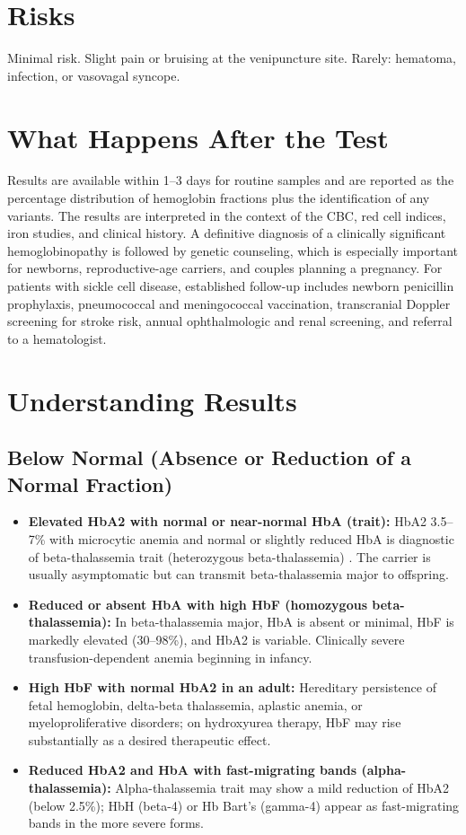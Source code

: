 \section*{Risks}
Minimal risk. Slight pain or bruising at the venipuncture site. Rarely: hematoma, infection, or vasovagal syncope.

\section*{What Happens After the Test}
Results are available within 1--3 days for routine samples and are reported as the percentage distribution of hemoglobin fractions plus the identification of any variants. The results are interpreted in the context of the CBC, red cell indices, iron studies, and clinical history. A definitive diagnosis of a clinically significant hemoglobinopathy is followed by genetic counseling, which is especially important for newborns, reproductive-age carriers, and couples planning a pregnancy. For patients with sickle cell disease, established follow-up includes newborn penicillin prophylaxis, pneumococcal and meningococcal vaccination, transcranial Doppler screening for stroke risk, annual ophthalmologic and renal screening, and referral to a hematologist.

\section*{Understanding Results}

\subsection*{Below Normal (Absence or Reduction of a Normal Fraction)}
\begin{itemize}
  \item \textbf{Elevated HbA2 with normal or near-normal HbA (trait):} HbA2 3.5--7\% with microcytic anemia and normal or slightly reduced HbA is diagnostic of beta-thalassemia trait (heterozygous beta-thalassemia) \cite{thein2013molecular}. The carrier is usually asymptomatic but can transmit beta-thalassemia major to offspring.
  \item \textbf{Reduced or absent HbA with high HbF (homozygous beta-thalassemia):} In beta-thalassemia major, HbA is absent or minimal, HbF is markedly elevated (30--98\%), and HbA2 is variable. Clinically severe transfusion-dependent anemia beginning in infancy.
  \item \textbf{High HbF with normal HbA2 in an adult:} Hereditary persistence of fetal hemoglobin, delta-beta thalassemia, aplastic anemia, or myeloproliferative disorders; on hydroxyurea therapy, HbF may rise substantially as a desired therapeutic effect.
  \item \textbf{Reduced HbA2 and HbA with fast-migrating bands (alpha-thalassemia):} Alpha-thalassemia trait may show a mild reduction of HbA2 (below 2.5\%); HbH (beta-4) or Hb Bart's (gamma-4) appear as fast-migrating bands in the more severe forms.
\end{itemize}

